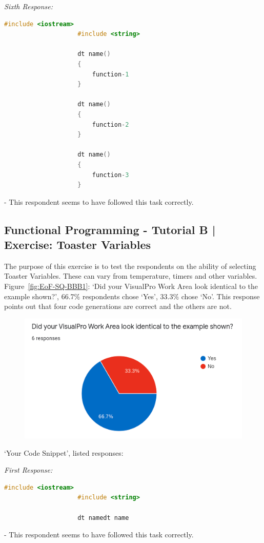 \documentclass[12pt]{report} %
\begin{document}
				\textit{Sixth Response:}
				\begin{lstlisting}[language=c++]
					#include <iostream>
					#include <string>

					dt name()
					{
						function-1
					}

					dt name()
					{
						function-2
					}

					dt name()
					{
						function-3
					}
				\end{lstlisting} - This respondent seems to have followed this task correctly.

			\subsection{Functional Programming - Tutorial B | Exercise: Toaster Variables}
				The purpose of this exercise is to test the respondents on the ability of selecting Toaster Variables. These can vary from temperature, timers and other variables. Figure~\ref{fig:EoF-SQ-BBB1}: `Did your VisualPro Work Area look identical to the example shown?', 66.7\% respondents chose `Yes', 33.3\% chose `No'. This response points out that four code generations are correct and the others are not.

				\begin{figure}[H]
					{\includegraphics[scale=0.50]{Figures/VisualPro-Survey_Results/SQ-BBB1.png}}
				\end{figure}

				`Your Code Snippet', listed responses:

				\textit{First Response:}
				\begin{lstlisting}[language=c++]
					#include <iostream>
					#include <string>

					dt namedt name
				\end{lstlisting} - This respondent seems to have followed this task correctly.
\end{document}
